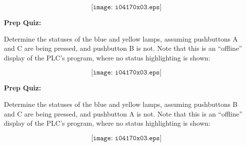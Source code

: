 $$\texttt{[image: i04170x03.eps]}$$

\vfil \eject

\noindent
{\bf Prep Quiz:}

Determine the statuses of the blue and yellow lamps, assuming pushbuttons A and C are being pressed, and pushbutton B is not.  Note that this is an ``offline'' display of the PLC's program, where no status highlighting is shown:

$$\texttt{[image: i04170x03.eps]}$$

\vfil \eject

\noindent
{\bf Prep Quiz:}

Determine the statuses of the blue and yellow lamps, assuming pushbuttons B and C are being pressed, and pushbutton A is not.  Note that this is an ``offline'' display of the PLC's program, where no status highlighting is shown:

$$\texttt{[image: i04170x03.eps]}$$







